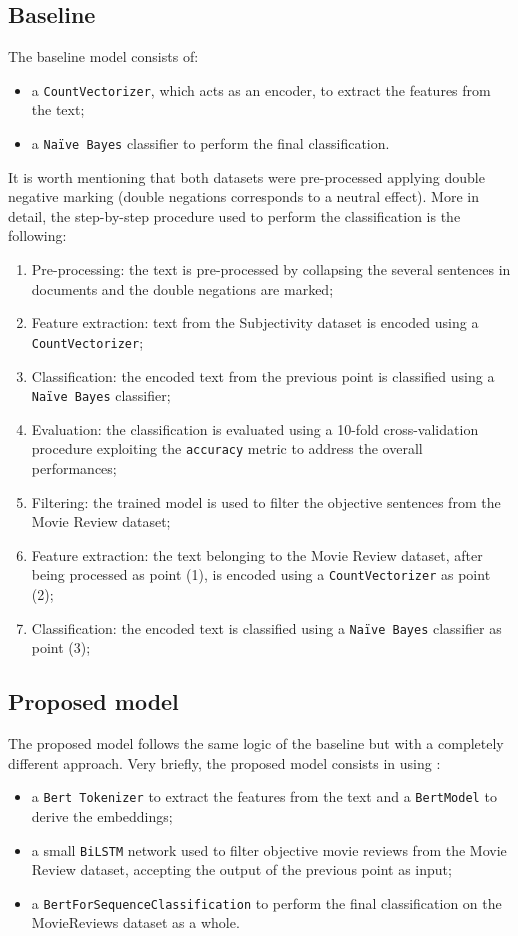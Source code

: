 \subsection{Baseline}
\label{subsec:basemodel}
The baseline model consists of:
\begin{itemize}
    \item a \texttt{CountVectorizer}\cite{vectorizer}, which acts as an encoder, to extract the features from the text;
    \item a \texttt{Na\"{i}ve Bayes}\cite{naive} classifier to perform the final classification.
\end{itemize}
It is worth mentioning that both datasets were pre-processed applying double negative marking (double negations corresponds to a neutral effect).
More in detail, the step-by-step procedure used to perform the classification is the following:
\begin{enumerate}
    \item Pre-processing: the text is pre-processed by collapsing the several sentences in documents and the double negations are marked;
    \item Feature extraction: text from the Subjectivity dataset is encoded using a \texttt{CountVectorizer};
    \item Classification: the encoded text from the previous point is classified using a \texttt{Na\"{i}ve Bayes} classifier;
    \item Evaluation: the classification is evaluated using a 10-fold cross-validation procedure exploiting the \texttt{accuracy} metric to address the overall performances;
    \item Filtering: the trained model is used to filter the objective sentences from the Movie Review dataset;    
    \item Feature extraction: the text belonging to the Movie Review dataset, after being processed as point (1), is encoded using a \texttt{CountVectorizer} as point (2);
    \item Classification: the encoded text is classified using a \texttt{Na\"{i}ve Bayes} classifier as point (3);
\end{enumerate}
\vspace{-0.25cm}
\subsection{Proposed model}
The proposed model follows the same logic of the baseline but with a completely different approach.
Very briefly, the proposed model consists in using :
\begin{itemize}
    \item a \texttt{Bert Tokenizer} \cite{tokenizer} to extract the features from the text and a \texttt{BertModel} \cite{model} to derive the embeddings;
    \item a small \texttt{BiLSTM} network used to filter objective movie reviews from the Movie Review dataset, accepting the output of the previous point as input;
    \item a \texttt{BertForSequenceClassification} to perform the final classification on the MovieReviews dataset as a whole.
\end{itemize}

